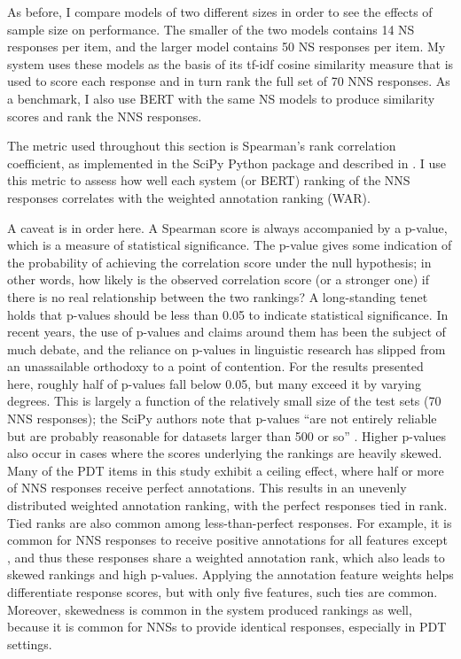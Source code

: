 As before, I compare models of two different sizes in order to see the effects of sample size on performance. The smaller of the two models contains 14 NS responses per item, and the larger model contains 50 NS responses per item. My system uses these models as the basis of its tf-idf cosine similarity measure that is used to score each response and in turn rank the full set of 70 NNS responses. As a benchmark, I also use BERT with the same NS models to produce similarity scores and rank the NNS responses.

The metric used throughout this section is Spearman's rank correlation coefficient, as implemented in the SciPy Python package \cite{2020scipy} and described in \citet{zwillinger1999crc}. I use this metric to assess how well each system (or BERT) ranking of the NNS responses correlates with the weighted annotation ranking (WAR).

A caveat is in order here. A Spearman score is always accompanied by a p-value, which is a measure of statistical significance. The p-value gives some indication of the probability of achieving the correlation score under the null hypothesis; in other words, how likely is the observed correlation score (or a stronger one) if there is no real relationship between the two rankings? A long-standing tenet holds that p-values should be less than 0.05 to indicate statistical significance. In recent years, the use of p-values and claims around them has been the subject of much debate, and the reliance on p-values in linguistic research has slipped from an unassailable orthodoxy to a point of contention. For the results presented here, roughly half of p-values fall below 0.05, but many exceed it by varying degrees. This is largely a function of the relatively small size of the test sets (70 NNS responses); the SciPy authors note that p-values ``are not entirely reliable but are probably reasonable for datasets larger than 500 or so'' \cite{2020scipy}. Higher p-values also occur in cases where the scores underlying the rankings are heavily skewed. Many of the PDT items in this study exhibit a ceiling effect, where half or more of NNS responses receive perfect annotations. This results in an unevenly distributed weighted annotation ranking, with the perfect responses tied in rank. Tied ranks are also common among less-than-perfect responses. For example, it is common for NNS responses to receive positive annotations for all features except , and thus these responses share a weighted annotation rank, which also leads to skewed rankings and high p-values. Applying the annotation feature weights helps differentiate response scores, but with only five features, such ties are common. Moreover, skewedness is common in the system produced rankings as well, because it is common for NNSs to provide identical responses, especially in  PDT settings.

